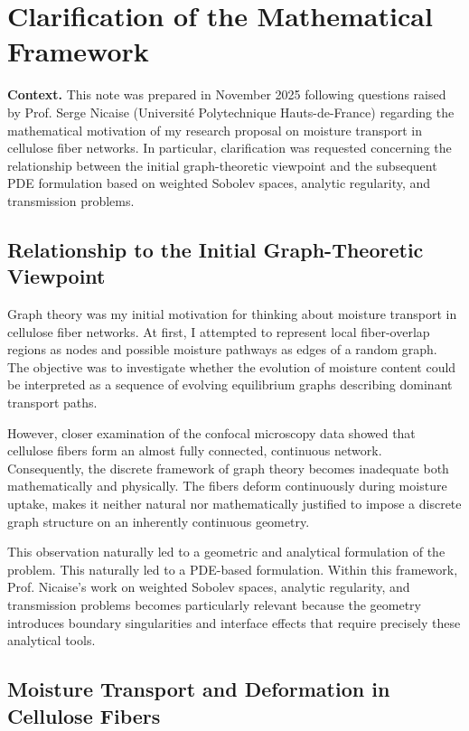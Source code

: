 \section*{Clarification of the Mathematical Framework}

\noindent\textbf{Context.}
This note was prepared in November 2025 following questions raised by Prof. Serge Nicaise (Université Polytechnique Hauts-de-France) regarding the mathematical motivation of my research proposal on moisture transport in cellulose fiber networks. In particular, clarification was requested concerning the relationship between the initial graph-theoretic viewpoint and the subsequent PDE formulation based on weighted Sobolev spaces, analytic regularity, and transmission problems.

\subsection*{Relationship to the Initial Graph-Theoretic Viewpoint}

Graph theory was my initial motivation for thinking about moisture transport in cellulose fiber networks. At first, I attempted to represent local fiber-overlap regions as nodes and possible moisture pathways as edges of a random graph. The objective was to investigate whether the evolution of moisture content could be interpreted as a sequence of evolving equilibrium graphs describing dominant transport paths.

However, closer examination of the confocal microscopy data showed that cellulose fibers form an almost fully connected, continuous network. Consequently, the discrete framework of graph theory becomes inadequate both mathematically and physically. The fibers deform continuously during moisture uptake, makes it neither natural nor mathematically justified to impose a discrete graph structure on an inherently continuous geometry.

This observation naturally led to a geometric and analytical formulation of the problem. This naturally led to a PDE-based formulation. Within this framework, Prof. Nicaise's work on weighted Sobolev spaces, analytic regularity, and transmission problems becomes particularly relevant because the geometry introduces boundary singularities and interface effects that require precisely these analytical tools.

\subsection*{Moisture Transport and Deformation in Cellulose Fibers}

